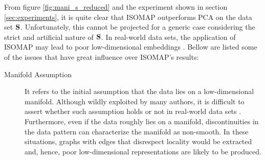 From figure \ref{fig:mani_s_reduced} and the experiment shown in section \ref{sec:experiments}, it is quite clear that ISOMAP outperforms PCA on the data set $\mathbf{S}$. Unfortunately, this cannot be projected for a generic case considering the strict and artificial nature of $\mathbf{S}$. In real-world data sets, the application of ISOMAP may lead to poor low-dimensional embeddings \cite{herik2009}. Bellow are listed some of the issues that have great influence over ISOMAP's results:
\begin{description}
	\item[Manifold Assumption] It refers to the initial assumption that the data lies on a low-dimensional manifold. Although wildly exploited by many authors, it is difficult to assert whether such assumption holds or not in real-world data sets \cite{lin2008riemannian}. Furthermore, even if the data roughly lies on a manifold, discontinuities in the data pattern can characterize the manifold as non-smooth. In these situations, graphs with edges that disrespect locality would be extracted and, hence, poor low-dimensional representations are likely to be produced.

	\newpage


\end{description}
